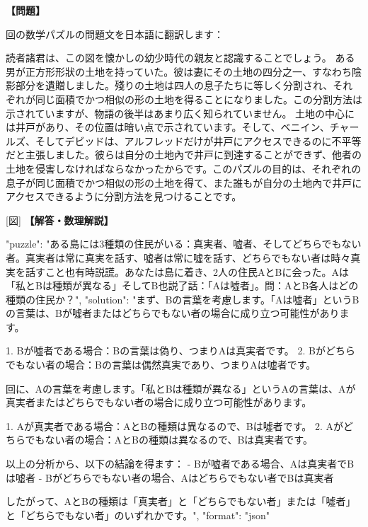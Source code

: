 \documentclass[10pt,a4paper,oneside,openany]{ltjsbook}
\begin{document}
\begin{tcolorbox}[colback=softblue,colframe=primaryblue,title=\textbf{第 180 問：THE FOUR SONS.},arc=2mm,boxrule=1pt,breakable]
\textbf{【問題】}\par\vspace{0.3em}
回の数学パズルの問題文を日本語に翻訳します：

読者諸君は、この図を懐かしの幼少時代の親友と認識することでしょう。
ある男が正方形形狀の土地を持っていた。彼は妻にその土地の四分之一、すなわち陰影部分を遺贈しました。殘りの土地は四人の息子たちに等しく分割され、それぞれが同じ面積でかつ相似の形の土地を得ることになりました。この分割方法は示されていますが、物語の後半はあまり広く知られていません。
土地の中心には井戸があり、その位置は暗い点で示されています。そして、ベニイン、チャールズ、そしてデビッドは、アルフレッドだけが井戸にアクセスできるのに不平等だと主張しました。彼らは自分の土地內で井戸に到達することができず、他者の土地を侵害しなければならなかったからです。このパズルの目的は、それぞれの息子が同じ面積でかつ相似の形の土地を得て、また誰もが自分の土地內で井戸にアクセスできるように分割方法を見つけることです。

[図]
\tcblower
\textbf{【解答・数理解説】}\par\vspace{0.3em}
{
  "puzzle": "ある島には3種類の住民がいる：真実者、噓者、そしてどちらでもない者。真実者は常に真実を話す、噓者は常に噓を話す、どちらでもない者は時々真実を話すこと也有時説謊。あなたは島に着き、2人の住民AとBに会った。Aは「私とBは種類が異なる」そしてB也説了話：「Aは噓者」。問：AとB各人はどの種類の住民か？",
  "solution": "まず、Bの言葉を考慮します。「Aは噓者」というBの言葉は、Bが噓者またはどちらでもない者の場合に成り立つ可能性があります。

1. Bが噓者である場合：Bの言葉は偽り、つまりAは真実者です。
2. Bがどちらでもない者の場合：Bの言葉は偶然真実であり、つまりAは噓者です。

回に、Aの言葉を考慮します。「私とBは種類が異なる」というAの言葉は、Aが真実者またはどちらでもない者の場合に成り立つ可能性があります。

1. Aが真実者である場合：AとBの種類は異なるので、Bは噓者です。
2. Aがどちらでもない者の場合：AとBの種類は異なるので、Bは真実者です。

以上の分析から、以下の結論を得ます：
- Bが噓者である場合、Aは真実者でBは噓者
- Bがどちらでもない者の場合、Aはどちらでもない者でBは真実者

したがって、AとBの種類は「真実者」と「どちらでもない者」または「噓者」と「どちらでもない者」のいずれかです。",
  "format": "json"
}
\end{tcolorbox}
\end{document}
